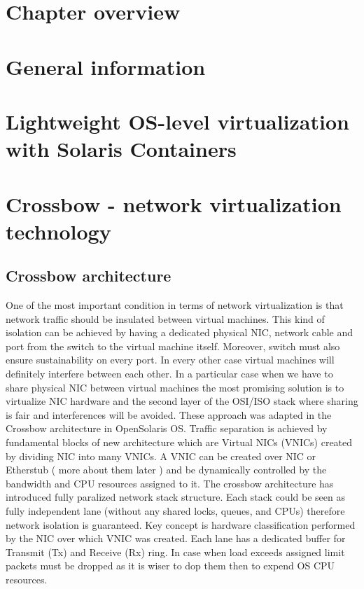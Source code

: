 \documentclass[11pt]{book}
\begin{document}
    \section*{Chapter overview}

    \section{General information}

    \section{Lightweight OS-level virtualization with Solaris Containers}

    \section{Crossbow - network virtualization technology}

    \subsection{Crossbow architecture}

      One of the most important condition in terms of network virtualization is that network traffic
      should be insulated between virtual machines. This kind of isolation can be achieved by having
      a dedicated physical NIC, network cable and port from the switch to the virtual machine
      itself.  Moreover, switch must also ensure sustainability on every port. In every other case
      virtual machines will definitely interfere between each other.
 In a particular case when we
      have to share physical NIC between virtual machines the most promising solution is to
      virtualize NIC hardware and the second layer of the OSI/ISO stack where sharing is fair and
      interferences will be avoided. These approach was adapted in the Crossbow architecture in
      OpenSolaris OS.
 Traffic separation is achieved by fundamental blocks of new architecture
      which are Virtual NICs (VNICs) created by dividing NIC into many VNICs. 
 A VNIC can be
      created over NIC or Etherstub ( more about them later ) and be dynamically controlled by the
      bandwidth and CPU resources assigned to it.
 The crossbow architecture has introduced fully
      paralized network stack structure. Each stack could be seen as fully independent lane (without
      any shared locks, queues, and CPUs) therefore network isolation is guaranteed. Key concept is
      hardware classification performed by the NIC over which VNIC was created. Each lane has a
      dedicated buffer for Transmit (Tx) and Receive (Rx) ring. In case when load exceeds assigned
      limit packets must be dropped as it is wiser to dop them then to expend OS CPU resources. 
\end{document}
